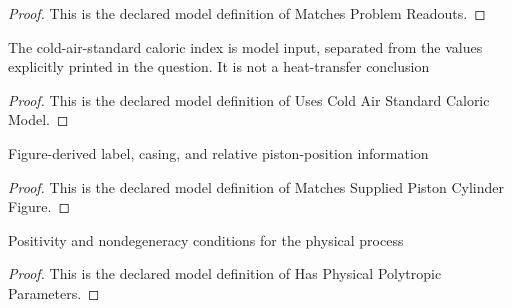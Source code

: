 \begin{proof}
  This is the declared model definition of Matches Problem Readouts.
\end{proof}
\begin{definition}
  \label{def:physics:phyx-mini-0460:phyxminiproblems-problemphyxmini0460-usescoldairstandardcaloricmodel}
  The cold-air-standard caloric index is model input, separated from the values explicitly printed in the question. It is not a heat-transfer conclusion
\end{definition}
\begin{proof}
  This is the declared model definition of Uses Cold Air Standard Caloric Model.
\end{proof}
\begin{definition}
  \label{def:physics:phyx-mini-0460:phyxminiproblems-problemphyxmini0460-matchessuppliedpistoncylinderfigure}
  Figure-derived label, casing, and relative piston-position information
\end{definition}
\begin{proof}
  This is the declared model definition of Matches Supplied Piston Cylinder Figure.
\end{proof}
\begin{definition}
  \label{def:physics:phyx-mini-0460:phyxminiproblems-problemphyxmini0460-hasphysicalpolytropicparameters}
  Positivity and nondegeneracy conditions for the physical process
\end{definition}
\begin{proof}
  This is the declared model definition of Has Physical Polytropic Parameters.
\end{proof}
